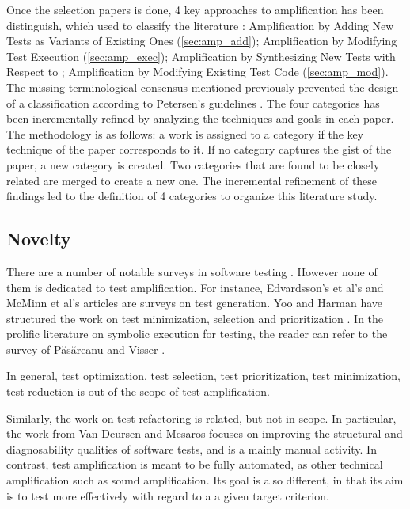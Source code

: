 Once the selection papers is done, 4 key approaches to amplification has been distinguish, which used to classify the literature : 
Amplification by Adding New Tests as Variants of Existing Ones (\autoref{sec:amp_add});
Amplification by Modifying Test Execution (\autoref{sec:amp_exec});
Amplification by Synthesizing New Tests with Respect to ; 
Amplification by Modifying Existing Test Code (\autoref{sec:amp_mod}).
The missing terminological consensus mentioned previously prevented the design of a classification according to Petersen's guidelines
\cite{petersen2008systematic}.
The four categories has been incrementally refined by analyzing the techniques and goals in each paper.
The methodology is as follows: a work is assigned to a category if the key technique of the paper corresponds to it.
If no category captures the gist of the paper, a new category is created.
Two categories that are found to be closely related are merged to create a new one.
The incremental refinement of these findings led to the definition of 4 categories to organize this literature study.

\subsection{Novelty}

There are a number of notable surveys in software testing \cite{edvardsson1999survey,mcminn2004search,anand2013orchestrated}. 
However none of them is dedicated to test amplification.
For instance, Edvardsson's et al's \cite{edvardsson1999survey} and McMinn et al's \cite{mcminn2004search} articles are surveys on test generation.
Yoo and Harman have structured the work on test minimization, selection and prioritization \cite{yoo2012survey} .
In the prolific literature on symbolic execution for testing, the reader can refer to the survey of 
Păsăreanu and Visser \cite{puasuareanu2009survey}.

In general, test optimization, test selection, test prioritization, test minimization, test reduction is out of the scope of test amplification.

Similarly, the work on test refactoring is related, but not in scope. 
In particular, the work from Van Deursen \etal\cite{vandeursen2001refactoring,DBLP:series/springer/MoonenDZB08} and Mesaros\cite{Meszaros2006} focuses on improving the structural and diagnosability qualities of software tests, and is a mainly manual activity. 
In contrast, test amplification is meant to be fully automated, as other technical amplification such as sound amplification. 
Its goal is also different, in that its aim is to test more effectively with regard to a a given target criterion.

